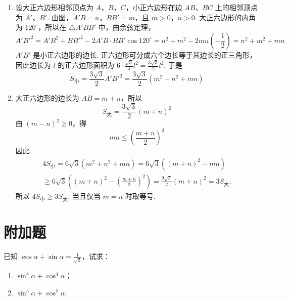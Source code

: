 \begin{solution}
\begin{enumerate}
\item 设大正六边形相邻顶点为 \(A\)，\(B\)，\(C\)，小正六边形在边 \(AB\)、\(BC\) 上的相邻顶点为 \(A'\)、\(B'\). 由图，\(A'B=n\)，\(BB'=m\)，且 \(m>0\)，\(n>0\). 大正六边形的内角为 \(120^{\circ}\)，所以在 \(\triangle A'BB'\) 中，由余弦定理，
\[
A'B'^{2}=A'B^{2}+BB'^{2}-2A'B\cdot BB'\cos120^{\circ}
 =n^{2}+m^{2}-2mn\left(-\frac{1}{2}\right)
 =n^{2}+m^{2}+mn
\]
\(A'B'\) 是小正六边形的边长. 正六边形可分成六个边长等于其边长的正三角形，因此边长为 \(l\) 的正六边形面积为 \(6\cdot\frac{\sqrt{3}}{4}l^{2}=\frac{3\sqrt{3}}{2}l^{2}\). 于是
\[
S_{\text{小}}=\frac{3\sqrt{3}}{2}A'B'^{2}=\frac{3\sqrt{3}}{2}\left(m^{2}+n^{2}+mn\right)
\]

\item 大正六边形的边长为 \(AB=m+n\)，所以
\[
S_{\text{大}}=\frac{3\sqrt{3}}{2}\left(m+n\right)^{2}
\]
由 \(\left(m-n\right)^{2}\geqslant0\)，得
\[
mn\leqslant\left(\frac{m+n}{2}\right)^{2}
\]
因此
\[
\begin{gathered}
4S_{\text{小}}=6\sqrt{3}\left(m^{2}+n^{2}+mn\right)
 =6\sqrt{3}\left(\left(m+n\right)^{2}-mn\right)\\
\geqslant6\sqrt{3}\left(\left(m+n\right)^{2}-\left(\frac{m+n}{2}\right)^{2}\right)
 =\frac{9\sqrt{3}}{2}\left(m+n\right)^{2}=3S_{\text{大}}.
\end{gathered}
\]
所以 \(4S_{\text{小}}\geqslant3S_{\text{大}}\). 当且仅当 \(m=n\) 时取等号.
\end{enumerate}
\end{solution}

\section{附加题}

\begin{problem}
已知 \(\cos\alpha+\sin\alpha=\frac{1}{\sqrt{2}}\)，试求：

\begin{enumerate}
\item \(\sin^{4}\alpha+\cos^{4}\alpha\)；
\item \(\sin^{5}\alpha+\cos^{5}\alpha\).
\end{enumerate}
\end{problem}

